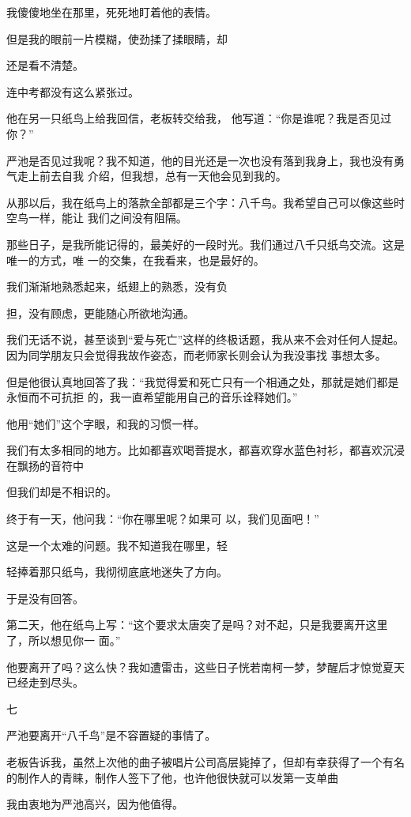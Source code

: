 \documentclass{article}
\begin{document}
我傻傻地坐在那里，死死地盯着他的表情。 

但是我的眼前一片模糊，使劲揉了揉眼睛，却
\newpage

还是看不清楚。 


连中考都没有这么紧张过。 

他在另一只纸鸟上给我回信，老板转交给我，
他写道：“你是谁呢？我是否见过你？” 

严池是否见过我呢？我不知道，他的目光还是一次也没有落到我身上，我也没有勇气走上前去自我
介绍，但我想，总有一天他会见到我的。 

从那以后，我在纸鸟上的落款全部都是三个字：八千鸟。我希望自己可以像这些时空鸟一样，能让
我们之间没有阻隔。 

那些日子，是我所能记得的，最美好的一段时光。我们通过八千只纸鸟交流。这是唯一的方式，唯
一的交集，在我看来，也是最好的。 

我们渐渐地熟悉起来，纸翅上的熟悉，没有负

\newpage
担，没有顾虑，更能随心所欲地沟通。 

我们无话不说，甚至谈到“爱与死亡”这样的终极话题，我从来不会对任何人提起。因为同学朋友只会觉得我故作姿态，而老师家长则会认为我没事找
事想太多。 

但是他很认真地回答了我：“我觉得爱和死亡只有一个相通之处，那就是她们都是永恒而不可抗拒
的，我一直希望能用自己的音乐诠释她们。” 


他用“她们”这个字眼，和我的习惯一样。 

我们有太多相同的地方。比如都喜欢喝菩提水，都喜欢穿水蓝色衬衫，都喜欢沉浸在飘扬的音符中


但我们却是不相识的。 

终于有一天，他问我：“你在哪里呢？如果可
以，我们见面吧！” 

这是一个太难的问题。我不知道我在哪里，轻
\newpage

轻捧着那只纸鸟，我彻彻底底地迷失了方向。 


于是没有回答。 

第二天，他在纸鸟上写：“这个要求太唐突了是吗？对不起，只是我要离开这里了，所以想见你一
面。” 

他要离开了吗？这么快？我如遭雷击，这些日子恍若南柯一梦，梦醒后才惊觉夏天已经走到尽头。


七 

严池要离开“八千鸟”是不容置疑的事情了。

老板告诉我，虽然上次他的曲子被唱片公司高层毙掉了，但却有幸获得了一个有名的制作人的青睐，制作人签下了他，也许他很快就可以发第一支单曲


我由衷地为严池高兴，因为他值得。 
\end{document}
